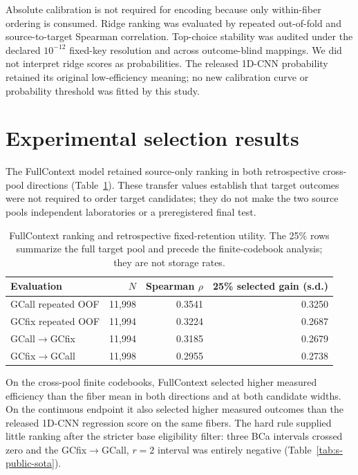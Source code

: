 \documentclass[10pt]{article}
\begin{document}
Absolute calibration is not required for encoding because only within-fiber ordering is consumed. Ridge ranking was evaluated by repeated out-of-fold and source-to-target Spearman correlation. Top-choice stability was audited under the declared $10^{-12}$ fixed-key resolution and across outcome-blind mappings. We did not interpret ridge scores as probabilities. The released 1D-CNN probability retained its original low-efficiency meaning; no new calibration curve or probability threshold was fitted by this study.

\section{Experimental selection results}

The FullContext model retained source-only ranking in both retrospective cross-pool directions (Table~\ref{tab:s-ranking}). These transfer values establish that target outcomes were not required to order target candidates; they do not make the two source pools independent laboratories or a preregistered final test.

\begin{table}[H]
\centering
\small
\begin{tabular}{lrrr}
\toprule
Evaluation & $N$ & Spearman $\rho$ & 25\% selected gain (s.d.) \\
\midrule
GCall repeated OOF & 11,998 & 0.3541 & 0.3250 \\
GCfix repeated OOF & 11,994 & 0.3224 & 0.2687 \\
GCall$\rightarrow$GCfix & 11,994 & 0.3185 & 0.2679 \\
GCfix$\rightarrow$GCall & 11,998 & 0.2955 & 0.2738 \\
\bottomrule
\end{tabular}
\caption{FullContext ranking and retrospective fixed-retention utility. The 25\% rows summarize the full target pool and precede the finite-codebook analysis; they are not storage rates.}
\label{tab:s-ranking}
\end{table}

On the cross-pool finite codebooks, FullContext selected higher measured efficiency than the fiber mean in both directions and at both candidate widths. On the continuous endpoint it also selected higher measured outcomes than the released 1D-CNN regression score on the same fibers. The hard rule supplied little ranking after the stricter base eligibility filter: three BCa intervals crossed zero and the GCfix$\rightarrow$GCall, $r=2$ interval was entirely negative (Table~\ref{tab:s-public-sota}).
\end{document}
